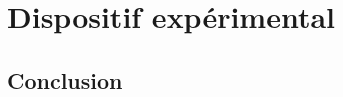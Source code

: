 \chapter{Dispositif expérimental}\label{chapter-LHC}





\section{Conclusion}\label{chapter-LHC-section-conclusion}
